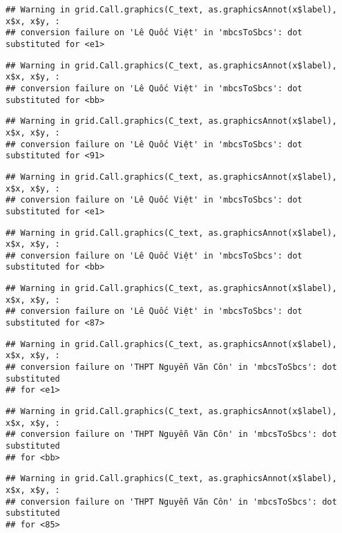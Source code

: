 \documentclass[
]{article}
\begin{document}
\begin{verbatim}
## Warning in grid.Call.graphics(C_text, as.graphicsAnnot(x$label), x$x, x$y, :
## conversion failure on 'Lê Quốc Việt' in 'mbcsToSbcs': dot substituted for <e1>
\end{verbatim}

\begin{verbatim}
## Warning in grid.Call.graphics(C_text, as.graphicsAnnot(x$label), x$x, x$y, :
## conversion failure on 'Lê Quốc Việt' in 'mbcsToSbcs': dot substituted for <bb>
\end{verbatim}

\begin{verbatim}
## Warning in grid.Call.graphics(C_text, as.graphicsAnnot(x$label), x$x, x$y, :
## conversion failure on 'Lê Quốc Việt' in 'mbcsToSbcs': dot substituted for <91>
\end{verbatim}

\begin{verbatim}
## Warning in grid.Call.graphics(C_text, as.graphicsAnnot(x$label), x$x, x$y, :
## conversion failure on 'Lê Quốc Việt' in 'mbcsToSbcs': dot substituted for <e1>
\end{verbatim}

\begin{verbatim}
## Warning in grid.Call.graphics(C_text, as.graphicsAnnot(x$label), x$x, x$y, :
## conversion failure on 'Lê Quốc Việt' in 'mbcsToSbcs': dot substituted for <bb>
\end{verbatim}

\begin{verbatim}
## Warning in grid.Call.graphics(C_text, as.graphicsAnnot(x$label), x$x, x$y, :
## conversion failure on 'Lê Quốc Việt' in 'mbcsToSbcs': dot substituted for <87>
\end{verbatim}

\begin{verbatim}
## Warning in grid.Call.graphics(C_text, as.graphicsAnnot(x$label), x$x, x$y, :
## conversion failure on 'THPT Nguyễn Văn Côn' in 'mbcsToSbcs': dot substituted
## for <e1>
\end{verbatim}

\begin{verbatim}
## Warning in grid.Call.graphics(C_text, as.graphicsAnnot(x$label), x$x, x$y, :
## conversion failure on 'THPT Nguyễn Văn Côn' in 'mbcsToSbcs': dot substituted
## for <bb>
\end{verbatim}

\begin{verbatim}
## Warning in grid.Call.graphics(C_text, as.graphicsAnnot(x$label), x$x, x$y, :
## conversion failure on 'THPT Nguyễn Văn Côn' in 'mbcsToSbcs': dot substituted
## for <85>
\end{verbatim}
\end{document}
